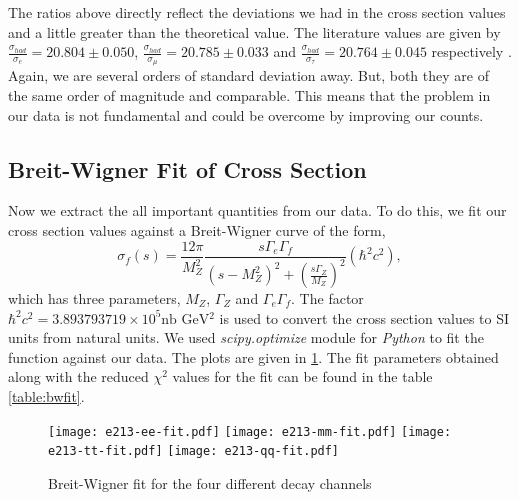 The ratios above directly reflect the deviations we had in the cross section values and a little greater than the theoretical value. The literature values are given by $\frac{\sigma_{had}}{\sigma_e} = 20.804 \pm 0.050$, $\frac{\sigma_{had}}{\sigma_{\mu}} = 20.785 \pm 0.033$ and $\frac{\sigma_{had}}{\sigma_{\tau}} = 20.764 \pm 0.045$ respectively \cite{pdg2}. Again, we are several orders of standard deviation away. But, both they are of the same order of magnitude and comparable. This means that the problem in our data is not fundamental and could be overcome by improving our counts.

\subsection{Breit-Wigner Fit of Cross Section}
Now we extract the all important quantities from our data. To do this, we fit our cross section values against a Breit-Wigner curve of the form,
\begin{equation}
    \sigma_f (s) = \frac{12\pi}{M_Z^2} \frac{s \Gamma_e \Gamma_f}{(s-M_Z^2)^2 + \left(\frac{s\Gamma_Z}{M_Z}\right)^2} (\hbar^2 c^2),
\end{equation}
which has three parameters, $M_Z$, $\Gamma_Z$ and $\Gamma_e\Gamma_f$. The factor $\hbar^2 c^2 = 3.893793719 \times 10^5 \text{nb GeV$^2$}$ is used to convert the cross section values to SI units from natural units. We used \textit{scipy.optimize} module for \textit{Python} to fit the function against our data. The plots are given in \ref{fig:bwfit}. The fit parameters obtained along with the reduced $\chi^2$ values for the fit can be found in the table \ref{table:bwfit}.\\
\begin{figure}[h!]
\begin{center}
    \texttt{[image: e213-ee-fit.pdf]}
    \texttt{[image: e213-mm-fit.pdf]}
    \texttt{[image: e213-tt-fit.pdf]}
    \texttt{[image: e213-qq-fit.pdf]}
\end{center}
\caption{Breit-Wigner fit for the four different decay channels}
\label{fig:bwfit}
\end{figure}
